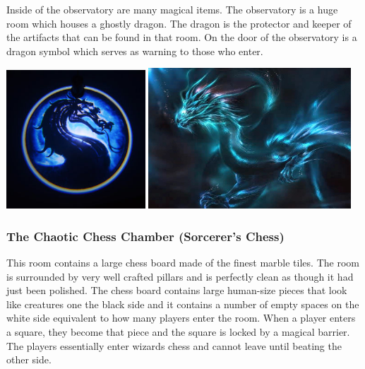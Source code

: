 Inside of the observatory are many magical items. The observatory is a huge room which houses a ghostly dragon. The dragon is the protector and keeper of the artifacts that can be found in that room. On the door of the observatory is a dragon symbol which serves as warning to those who enter.

\begin{center}
	\includegraphics[width=0.39\textwidth]{img/Karazhan/s-l300.jpg}
	\includegraphics[width=0.57\textwidth]{img/Karazhan/Cloud_dragon.jpg}
\end{center}

\subsubsection{The Chaotic Chess Chamber (Sorcerer's Chess)}

This room contains a large chess board made of the finest marble tiles. The room is surrounded by very well crafted pillars and is perfectly clean as though it had just been polished. The chess board contains large human-size pieces that look like creatures one the black side and it contains a number of empty spaces on the white side equivalent to how many players enter the room. When a player enters a square, they become that piece and the square is locked by a magical barrier. The players essentially enter wizards chess and cannot leave until beating the other side.


